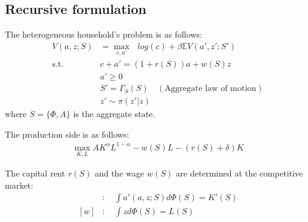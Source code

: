 \subsection*{Recursive formulation}
The heterogeneous household's problem is as follows:
\begin{align*}
  V(a,z;S) &= \max_{c,a'}\text{ } log(c) + \beta \mathbb{E}V(a',z';S')
  \\
  \text{s.t.}\quad& c + a' = (1+r(S))a + w(S)z
  \\
  & a'\geq 0
  \\
  & S' = \Gamma_{S}(S) \quad(\text{Aggregate law of motion})
  \\
  & z' \sim \pi(z'|z)
\end{align*}
where $S = \{\Phi,A\}$ is the aggregate state.

The production side is as follows:
\begin{align*}
  \max_{K,L} A K^{\alpha}L^{1-\alpha} - w(S)L - (r(S)+\delta)K
\end{align*}

The capital rent $r(S)$ and the wage $w(S)$ are determined at the competitive market:
\begin{align*}
  [r]&:\quad \int a'(a,z;S)d\Phi(S) = K'(S)
  \\
  [w]&:\quad \int z d\Phi(S) = L(S)
\end{align*}
